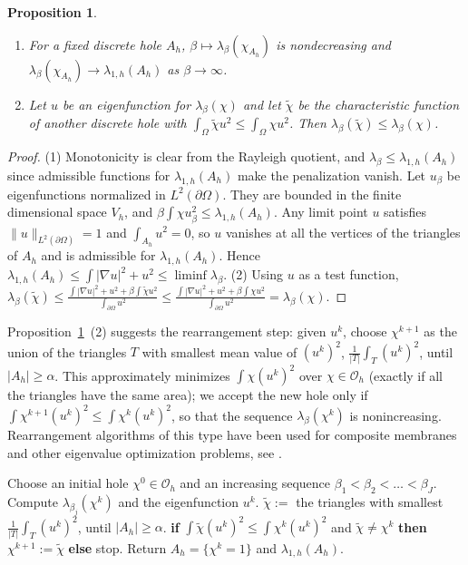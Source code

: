 \documentclass[11pt]{amsart}
\newtheorem{proposition}[lemma]{Proposition}
\theoremstyle{remark}
\numberwithin{equation}{section}
\begin{document}
\begin{proposition}\label{p.monotone}
\begin{enumerate}
\item For a fixed discrete hole $A_h$, $\beta\mapsto\lambda_\beta(\chi_{A_h})$ is nondecreasing and $\lambda_\beta(\chi_{A_h})\to\lambda_{1,h}(A_h)$ as $\beta\to\infty$.
\item Let $u$ be an eigenfunction for $\lambda_\beta(\chi)$ and let $\tilde\chi$ be the characteristic function of another discrete hole with $\int_\Omega\tilde\chi u^2\le\int_\Omega\chi u^2$. Then $\lambda_\beta(\tilde\chi)\le\lambda_\beta(\chi)$.
\end{enumerate}
\end{proposition}

\begin{proof}
(1) Monotonicity is clear from the Rayleigh quotient, and $\lambda_\beta\le\lambda_{1,h}(A_h)$ since admissible functions for $\lambda_{1,h}(A_h)$ make the penalization vanish. Let $u_\beta$ be eigenfunctions normalized in $L^2(\partial\Omega)$. They are bounded in the finite dimensional space $V_h$, and $\beta\int\chi u_\beta^2\le\lambda_{1,h}(A_h)$. Any limit point $u$ satisfies $\|u\|_{L^2(\partial\Omega)}=1$ and $\int_{A_h}u^2=0$, so $u$ vanishes at all the vertices of the triangles of $A_h$ and is admissible for $\lambda_{1,h}(A_h)$. Hence $\lambda_{1,h}(A_h)\le\int|\nabla u|^2+u^2\le\liminf\lambda_\beta$.
(2) Using $u$ as a test function, $\lambda_\beta(\tilde\chi)\le\frac{\int|\nabla u|^2+u^2+\beta\int\tilde\chi u^2}{\int_{\partial\Omega}u^2}\le\frac{\int|\nabla u|^2+u^2+\beta\int\chi u^2}{\int_{\partial\Omega}u^2}=\lambda_\beta(\chi)$.
\end{proof}

Proposition~\ref{p.monotone}~(2) suggests the rearrangement step: given $u^k$, choose $\chi^{k+1}$ as the union of the triangles $T$ with smallest mean value of $(u^k)^2$, $\frac1{|T|}\int_T(u^k)^2$, until $|A_h|\ge\alpha$. This approximately minimizes $\int\chi(u^k)^2$ over $\chi\in\mathcal{O}_h$ (exactly if all the triangles have the same area); we accept the new hole only if $\int\chi^{k+1}(u^k)^2\le\int\chi^k(u^k)^2$, so that the sequence $\lambda_\beta(\chi^k)$ is nonincreasing. Rearrangement algorithms of this type have been used for composite membranes and other eigenvalue optimization problems, see \cite{KS}.

\begin{algorithm}[h]
\caption{Penalized rearrangement with continuation in $\beta$}\label{alg.rearr}
\begin{algorithmic}[1]
\State Choose an initial hole $\chi^0\in\mathcal{O}_h$ and an increasing sequence $\beta_1<\beta_2<\dots<\beta_J$.
\Repeat
\State Compute $\lambda_{\beta_j}(\chi^k)$ and the eigenfunction $u^k$.
\State $\tilde\chi:=$ the triangles with smallest $\frac1{|T|}\int_T(u^k)^2$, until $|A_h|\ge\alpha$.
\State \textbf{if} $\int\tilde\chi(u^k)^2\le\int\chi^k(u^k)^2$ and $\tilde\chi\neq\chi^k$ \textbf{then} $\chi^{k+1}:=\tilde\chi$ \textbf{else} stop.
\EndFor
\State Return $A_h=\{\chi^k=1\}$ and $\lambda_{1,h}(A_h)$.
\end{algorithmic}
\end{algorithm}
\end{document}
